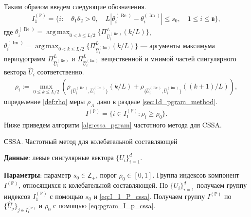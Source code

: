 \documentclass[specialist,
               substylefile = spbu.rtx,
               subf,href,colorlinks=true, 12pt]{disser}
\def\RE{\mathop{\mathrm{Re}}}
\def\argmax{\mathop{\mathrm{argmax}}}
\def\IM{\mathop{\mathrm{Im}}}
\def\argmax{\mathop{\mathrm{arg\,max}}}
\begin{document}
 
Таким образом введем следующие обозначения.  
\begin{gather} \label{eq:I_1_P_cssa}
I_1^{(\mathbb{P})} = \{ i: \quad \theta_1 \theta_2 >0, \quad L |\theta_i^{(\RE)} - \theta_{i}^{(\IM)}| \leqslant s_0, \quad 1 \leqslant i \leqslant в  \},
\end{gather}
где $\theta_i^{(\RE)} = \argmax_{0 < k \leqslant L/2} \{\Pi_{\widehat{U}^{(\RE)}_{i}}^L(k/L)\}$, $\theta_{i}^{(\IM)} = \argmax_{0 < k \leqslant L/2} \{\Pi_{\widehat{U}^{(\IM)}_{i}}^L(k/L)\}$ --- аргументы максимума периодограмм $\Pi_{\widehat{U}^{(\RE)}_{i}}^L$ и $\Pi_{\widehat{U}^{(\IM)}_{i}}^L$ вещественной и мнимой частей сингулярного вектора $\widehat{U}_i$ соответственно.
\begin{gather*}
\rho_{i} := \max_{0 \leqslant k \leqslant L/2}{\left(\rho_{\{\widehat{U}^{(\RE)}_{i},\widehat{U}^{(\IM)}_{i}\}}(k/L) + \rho_{\{\widehat{U}^{(\RE)}_{i},\widehat{U}^{(\IM)}_{i}\}}((k+1)/L)\right)},
\end{gather*}
определение \ref{def:rho} меры $\rho_A$ дано в разделе \ref{sec:1d_pgram_method}.
\begin{gather} \label{eq:pgram_I_p_cssa}
I^{(\mathbb{P})} = \{ i \in I_1^{(\mathbb{P})}: \rho_{i} \geqslant\rho_0 \}.
\end{gather}
Ниже приведем алгоритм \ref{alg:cssa_pgram} частотного метода для CSSA.
\begin{algorithm}[!hhh]
\caption{СSSA. Частотный метод для колебательной составляющей}
\label{alg:cssa_pgram}
\begin{algorithmic}[1]
\REQUIRE 
\item \textbf{Данные}: левые сингулярные вектора $\{U_i\}_{i=1}^{d}$.
\item \textbf{Параметры}: параметр $s_0 \in \mathsf{Z}_{+}$, порог $\rho_0 \in [0,1]$.
\ENSURE Группа индексов компонент $I^{(\mathbb{P})}$, относящихся к колебательной составляющей.
\STATE  По $\{U_i\}_{i=1}^{d}$ получаем группу индексов $I_1^{(\mathbb{P})}$ с помощью $s_0$ и \eqref{eq:I_1_P_cssa}.
\STATE Получаем группу $I^{(\mathbb{P})}$ по $\{\widehat{U}_j\}_{j \in I_1^{(\mathbb{P})}}$ и $\rho_0$ с помощью \eqref{eq:pgram_I_p_cssa}.
\end{algorithmic}
\end{algorithm}


\end{document}
